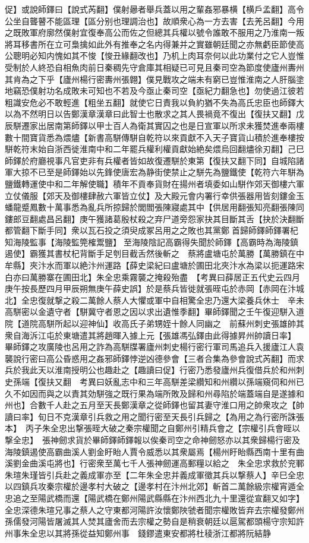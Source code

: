 促】或說師鐸曰【說式芮翻】僕射曏者舉兵蓋以用之輩姦邪暴横【横戶孟翻】高令公坐自聾瞽不能區理【區分别也理調治也】故順衆心為一方去害【去羌呂翻】今用之既敗軍府廓然僕射宜復奉高公而佐之但總其兵權以號令誰敢不服用之乃淮南一叛將耳移書所在立可梟擒如此外有推奉之名内得兼并之實雖朝廷聞之亦無虧臣節使高公聰明必知内愧如其不悛【悛丑緣翻改也】乃机上肉耳奈何以此功業付之它人豈惟受制於人終恐自相魚肉前日秦稠先守倉庫其相疑已可見且秦司空為節度使廬州夀州其肯為之下乎【廬州楊行密夀州張翺】僕見戰攻之端未有窮已豈惟淮南之人肝腦塗地竊恐僕射功名成敗未可知也不若及今亟止秦司空【亟紀力翻急也】勿使過江彼若粗識安危必不敢輕進【粗坐五翻】就使它日責我以負約猶不失為高氏忠臣也師鐸大以為不然明日以告鄭漢章漢章曰此智士也散求之其人畏禍竟不復出【復扶又翻】戊辰駢遷家出居南第師鐸以甲士百人為衛其實囚之也是日宣軍以所求未獲焚進奉兩樓數十間寶貨悉為煨燼【新書高駢傳駢自乾符以來貢獻不入天子寶貨山積於進奉樓按駢乾符末始自浙西徙淮南中和二年罷兵權利權貢獻始絶矣煨烏回翻燼徐刃翻】己巳師鐸於府廳視事凡官吏非有兵權者皆如故復遷駢於東第【復扶又翻下同】自城陷諸軍大掠不已至是師鐸始以先鋒使唐宏為静街使禁止之駢先為鹽鐵使【乾符六年駢為鹽鐵轉運使中和二年解使職】積年不貢奉貨財在揚州者填委如山駢作郊天御樓六軍立仗儀服【郊天及御樓肆赦六軍皆立仗】及大殿元會内署行幸供張器用皆刻鏤金玉蟠龍蹙鳳數十萬事悉為亂兵所掠歸於閭閻張陳寢處其中【供居用翻張知亮翻張陳同鏤郎豆翻處昌呂翻】庚午獲諸葛殷杖殺之弃尸道旁怨家抉其目斷其舌【抉於決翻斷都管翻下斷手同】衆以瓦石投之須臾成冢呂用之之敗也其黨鄭首歸師鐸師鐸署杞知海陵監事【海陵監筦榷鬻鹽】至海陵陰記高霸得失聞於師鐸【高霸時為海陵鎮遏使】霸獲其書杖杞背斷手足刳目截舌然後斬之　蔡將盧塘屯於萬勝【萬勝鎮在中牟縣】夾汴水而軍以絶汴州運路【薛史梁紀曰盧塘於圃田北夾汴水為梁以扼運路宋白亦曰萬勝寨在圃田北】朱全忠乘霧襲之掩殺殆盡　【考異曰薛居正五代史云四月庚午按長歷四月甲辰朔無庚午薛史誤】於是蔡兵皆徙就張晊屯於赤岡【赤岡在汴城北】全忠復就撃之殺二萬餘人蔡人大懼或軍中自相驚全忠乃還大梁養兵休士　辛未高駢密以金遺守者【駢冀守者恩之因以求出遺惟季翻】畢師鐸聞之壬午復迎駢入道院【道院高駢所起以迎神仙】收高氏子弟甥姪十餘人同幽之　前蘇州刺史張雄帥其衆自海泝江屯於東塘遣其將趙暉入據上元【張雄馮弘鐸由此得據昇州帥讀日率】　畢師鐸之攻廣陵也呂用之詐為高駢牒署廬州刺史楊行密行軍司馬追兵入援廬江人袁襲說行密曰高公昏惑用之姦邪師鐸悖逆凶德參會【三者合集為參會說式芮翻】而求兵於我此天以淮南授明公也趣赴之【趣讀曰促】行密乃悉發廬州兵復借兵於和州刺史孫端【復扶又翻　考異曰妖亂志中和三年高駢差梁纘知和州纘以孫端窺伺和州已久不如因而與之以責其効駢強之既行果為端所敗及歸和州尋陷於端蓋端自是遂據和州也】合數千人赴之五月至天長鄭漢章之從師鐸也留其妻守淮口用之帥衆攻之【帥讀曰率】旬日不克漢章引兵救之用之聞行密至天長引兵歸之【為用之為行密所誅張本】　丙子朱全忠出撃張晊大破之秦宗權聞之自鄭州引精兵會之【宗權引兵會晊以撃全忠】　張神劒求貨於畢師鐸師鐸報以俟秦司空之命神劒怒亦以其衆歸楊行密及海陵鎮遏使高霸曲溪人劉金盱眙人賈令威悉以其衆屬焉【楊州盱眙縣西南十里有曲溪劉金曲溪屯將也】行密衆至萬七千人張神劒運高郵糧以給之　朱全忠求救於兖鄆朱瑄朱瑾皆引兵赴之義成軍亦至【二年朱全忠并義成軍徵其兵以撃蔡人】辛巳全忠以四鎮兵攻秦宗權於邊孝村大破之【邊孝村在汴州北郊】斬首二萬餘級宗權宵遁全忠追之至陽武橋而還【陽武橋在鄭州陽武縣縣在汴州西北九十里還從宣翻又如字】全忠深德朱瑄兄事之蔡人之守東都河陽許汝懷鄭陜虢者聞宗權敗皆弃去宗權發鄭州孫儒發河陽皆屠滅其人焚其廬舍而去宗權之勢自是稍衰朝廷以扈駕都頭楊守宗知許州事朱全忠以其將孫從益知鄭州事　錢鏐遣東安都將杜稜浙江都將阮結静